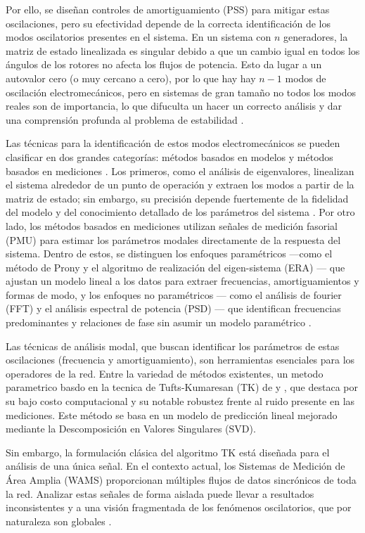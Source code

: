 \documentclass[conference]{IEEEtran}
\begin{document}
Por ello, se diseñan controles de amortiguamiento (PSS) para mitigar estas oscilaciones, pero su efectividad depende de la correcta identificación de los modos oscilatorios presentes en el sistema. En un sistema con $n$ generadores, la matriz de estado linealizada es singular debido a que un cambio igual en todos los ángulos de los rotores no afecta los flujos de potencia. Esto da lugar a un autovalor cero (o muy cercano a cero), por lo que hay hay $n-1$ modos de oscilación electromecánicos, pero en sistemas de gran tamaño no todos los modos reales son de importancia, lo que difuculta un hacer un correcto análisis y dar una comprensión profunda al problema de estabilidad \cite{roger}.

Las técnicas para la identificación de estos modos electromecánicos se pueden clasificar en dos grandes categorías: métodos basados en modelos y métodos basados en mediciones \cite{roger}. Los primeros, como el análisis de eigenvalores, linealizan el sistema alrededor de un punto de operación y extraen los modos a partir de la matriz de estado; sin embargo, su precisión depende fuertemente de la fidelidad del modelo y del conocimiento detallado de los parámetros del sistema \cite{kundur} \cite{roger}. Por otro lado, los métodos basados en mediciones utilizan señales de medición fasorial (PMU) para estimar los parámetros modales directamente de la respuesta del sistema. Dentro de estos, se distinguen los enfoques paramétricos —como el método de Prony y el algoritmo de realización del eigen-sistema (ERA)  — que ajustan un modelo lineal a los datos para extraer frecuencias, amortiguamientos y formas de modo, y los enfoques no paramétricos — como el análisis de fourier (FFT) y el análisis espectral de potencia (PSD) — que identifican frecuencias predominantes y relaciones de fase sin asumir un modelo paramétrico \cite{roger} \cite{Trudnowski}.

Las técnicas de análisis modal, que buscan identificar los parámetros de estas oscilaciones (frecuencia y amortiguamiento), son herramientas esenciales para los operadores de la red. Entre la variedad de métodos existentes,  un metodo parametrico basdo en la tecnica de Tufts-Kumaresan (TK) de \cite{tufts} y \cite{moghdam}, que destaca por su bajo costo computacional y su notable robustez frente al ruido presente en las mediciones. Este método se basa en un modelo de predicción lineal mejorado mediante la Descomposición en Valores Singulares (SVD).

Sin embargo, la formulación clásica del algoritmo TK está diseñada para el análisis de una única señal. En el contexto actual, los Sistemas de Medición de Área Amplia (WAMS) proporcionan múltiples flujos de datos sincrónicos de toda la red. Analizar estas señales de forma aislada puede llevar a resultados inconsistentes y a una visión fragmentada de los fenómenos oscilatorios, que por naturaleza son globales \cite{roger} \cite{Trudnowski}.
\end{document}
